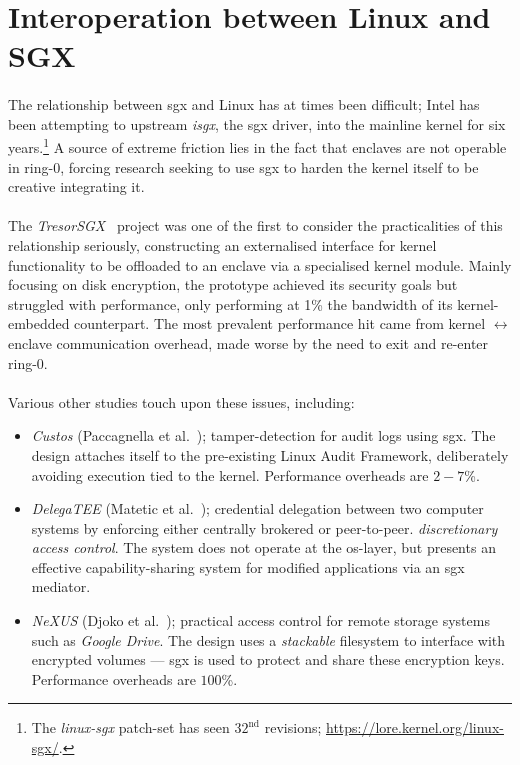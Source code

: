 \section{Interoperation between Linux and SGX} 
\paragraph{} The relationship between \acrshort{sgx} and Linux has at times been difficult; Intel has been attempting to upstream \textit{isgx}, the \acrshort{sgx} driver, into the mainline kernel for six years.\footnote{The \textit{linux-sgx} patch-set has seen $32^{\text{nd}}$ revisions; \url{https://lore.kernel.org/linux-sgx/}.} A source of extreme friction lies in the fact that enclaves are not operable in ring-0, forcing research seeking to use \acrshort{sgx} to harden the kernel itself to be creative integrating it.

\paragraph{} The \textit{TresorSGX}~\cite{10.1145/3007788.3007796} project was one of the first to consider the practicalities of this relationship seriously, constructing an externalised interface for kernel functionality to be offloaded to an enclave via a specialised kernel module. Mainly focusing on disk encryption, the prototype achieved its security goals but struggled with performance, only performing at 1\% the bandwidth of its kernel-embedded counterpart. The most prevalent performance hit came from kernel $\leftrightarrow$ enclave communication overhead, made worse by the need to exit and re-enter ring-0.


\paragraph{} Various other studies touch upon these issues, including:

\begin{itemize}
    \item \textit{Custos} (Paccagnella et al.~\cite{Karande2017SGXLogSS}); tamper-detection for audit logs using \acrshort{sgx}. The design attaches itself to the pre-existing Linux Audit Framework, deliberately avoiding execution tied to the kernel. Performance overheads are $2-7$\%. 
    \item \textit{DelegaTEE} (Matetic et al.~\cite{10.5555/3277203.3277308}); credential delegation between two computer systems by enforcing either centrally brokered or peer-to-peer. \textit{discretionary access control}. The system does not operate at the \acrshort{os}-layer, but presents an effective capability-sharing system for modified applications via an \acrshort{sgx} mediator.
    \item \textit{NeXUS} (Djoko et al.~\cite{nexus8809505}); practical access control for remote storage systems such as \textit{Google Drive}. The design uses a \textit{stackable} filesystem to interface with encrypted volumes --- \acrshort{sgx} is used to protect and share these encryption keys. Performance overheads are $100$\%.
\end{itemize}



